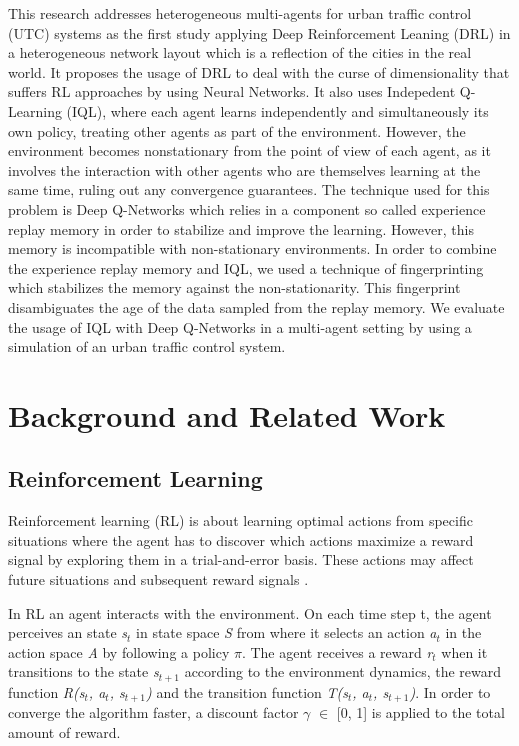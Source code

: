 \documentclass{llncs}
\begin{document}
This research addresses heterogeneous multi-agents for  urban traffic control (UTC) systems as the first study applying Deep Reinforcement Leaning (DRL) in a heterogeneous network layout which is a reflection of the cities in the real world. It proposes the usage of DRL to deal with the curse of dimensionality that suffers RL approaches by using Neural Networks. It also uses Indepedent Q-Learning (IQL), where each agent learns independently and simultaneously its own policy, treating other agents as part of the environment. However, the environment becomes nonstationary from the point of view of each agent, as it involves the interaction with other agents who are themselves learning at the same time, ruling out any convergence guarantees. The technique used for this problem is Deep Q-Networks which relies in a component so called experience replay memory in order to stabilize and improve the learning. However, this memory is incompatible with non-stationary environments. In order to combine the experience replay memory and IQL, we used a technique of fingerprinting which stabilizes the memory against the non-stationarity. This fingerprint disambiguates the age of the data sampled from the replay memory. We evaluate the usage of IQL with Deep Q-Networks in a multi-agent setting by using a simulation of an urban traffic control system.


\section{Background and Related Work}

\subsection{Reinforcement Learning}

Reinforcement learning (RL) is about learning optimal actions from specific situations where the agent has to discover which actions maximize a reward signal by exploring them in a trial-and-error basis. These actions may affect future situations and subsequent reward signals \cite{RichardS.SuttonandAndrewG.Barto2018}.

In RL an agent interacts with the environment. On each time step t, the agent perceives an state \textit{s$_{t}$} in state space \textit{S} from where it selects an action \textit{a$_{t}$} in the action space \textit{A} by following a policy \textit{$\pi$}. The agent receives a reward \textit{r$_{t}$} when it transitions to the state \textit{s$_{t+1}$} according to the environment dynamics, the reward function  \textit{R(s$_{t}$, a$_{t}$, s$_{t+1}$)} and the transition function \textit{T(s$_{t}$, a$_{t}$, s$_{t+1}$)}. In order to converge the algorithm faster, a discount factor $\gamma$ $\in$ [0, 1] is applied to the total amount of reward.
\end{document}
